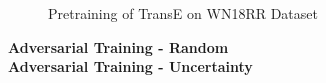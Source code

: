 \begin{figure}
\begin{minipage}{.3\textwidth}
    \end{minipage}%
    \caption{Pretraining of TransE on WN18RR Dataset}
    \label{fig:test}
\end{figure}


\textbf{Adversarial Training - Random}\\

\textbf{Adversarial Training - Uncertainty}\\